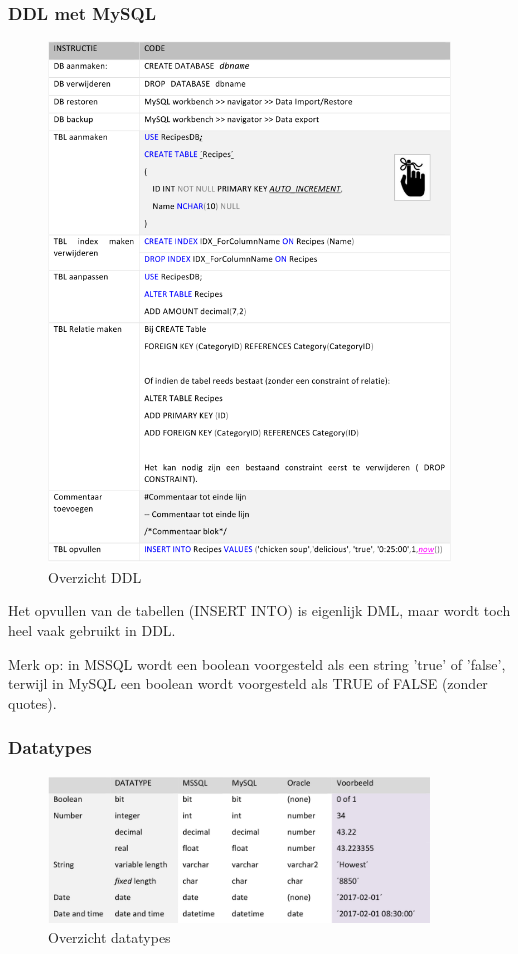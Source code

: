\documentclass{article}
\begin{document}
\subsubsection{DDL met MySQL}
\begin{figure}[H]
    \centering
    \includegraphics[width=0.95\textwidth]{overzicht-ddl.png}
    \caption{Overzicht DDL}
\end{figure}

Het opvullen van de tabellen (INSERT INTO) is eigenlijk DML, maar wordt toch heel vaak gebruikt in DDL.

Merk op: in MSSQL wordt een boolean voorgesteld als een string 'true' of 'false', terwijl
in MySQL een boolean wordt voorgesteld als TRUE of FALSE (zonder quotes). 

\subsubsection{Datatypes}
\begin{figure}[H]
    \centering
    \includegraphics[width=0.9\textwidth]{overzicht-datatypes.png}
    \caption{Overzicht datatypes}
\end{figure}
\end{document}

